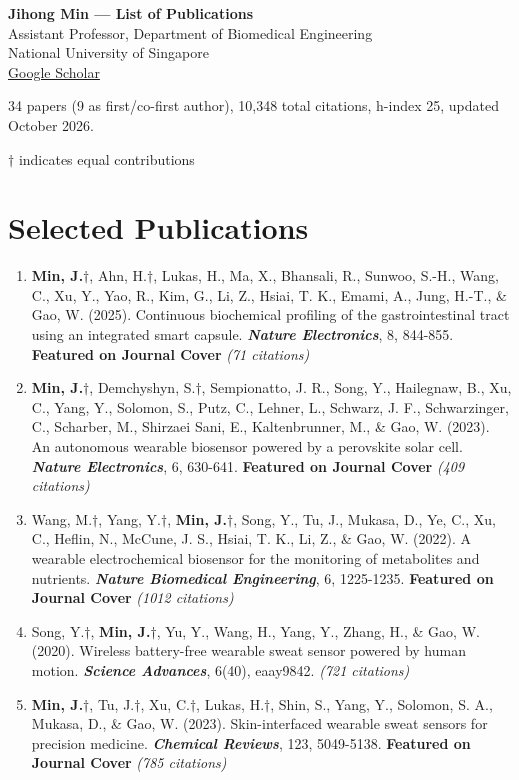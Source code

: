 \documentclass[11pt,a4paper]{article}
\begin{document}
{\LARGE \textbf{Jihong Min --- List of Publications}} \\[4pt]
Assistant Professor, Department of Biomedical Engineering \\
National University of Singapore \\
\href{https://scholar.google.com/citations?user=T4pVa1UAAAAJ}{Google Scholar}

34 papers (9 as first/co-first author), 10,348 total citations, h-index 25, updated October 2026.

$\dagger$ indicates equal contributions

\section{Selected Publications}
\begin{enumerate}[leftmargin=*, itemsep=3pt, parsep=0pt, topsep=2pt]
  \item \textbf{Min, J.}$\dagger$, Ahn, H.$\dagger$, Lukas, H., Ma, X., Bhansali, R., Sunwoo, S.-H., Wang, C., Xu, Y., Yao, R., Kim, G., Li, Z., Hsiai, T. K., Emami, A., Jung, H.-T., \& Gao, W. (2025). Continuous biochemical profiling of the gastrointestinal tract using an integrated smart capsule. \textbf{\textit{Nature Electronics}}, 8, 844-855. \textbf{Featured on Journal Cover} \textit{(71 citations)}
  \item \textbf{Min, J.}$\dagger$, Demchyshyn, S.$\dagger$, Sempionatto, J. R., Song, Y., Hailegnaw, B., Xu, C., Yang, Y., Solomon, S., Putz, C., Lehner, L., Schwarz, J. F., Schwarzinger, C., Scharber, M., Shirzaei Sani, E., Kaltenbrunner, M., \& Gao, W. (2023). An autonomous wearable biosensor powered by a perovskite solar cell. \textbf{\textit{Nature Electronics}}, 6, 630-641. \textbf{Featured on Journal Cover} \textit{(409 citations)}
  \item Wang, M.$\dagger$, Yang, Y.$\dagger$, \textbf{Min, J.}$\dagger$, Song, Y., Tu, J., Mukasa, D., Ye, C., Xu, C., Heflin, N., McCune, J. S., Hsiai, T. K., Li, Z., \& Gao, W. (2022). A wearable electrochemical biosensor for the monitoring of metabolites and nutrients. \textbf{\textit{Nature Biomedical Engineering}}, 6, 1225-1235. \textbf{Featured on Journal Cover} \textit{(1012 citations)}
  \item Song, Y.$\dagger$, \textbf{Min, J.}$\dagger$, Yu, Y., Wang, H., Yang, Y., Zhang, H., \& Gao, W. (2020). Wireless battery-free wearable sweat sensor powered by human motion. \textbf{\textit{Science Advances}}, 6(40), eaay9842. \textit{(721 citations)}
  \item \textbf{Min, J.}$\dagger$, Tu, J.$\dagger$, Xu, C.$\dagger$, Lukas, H.$\dagger$, Shin, S., Yang, Y., Solomon, S. A., Mukasa, D., \& Gao, W. (2023). Skin-interfaced wearable sweat sensors for precision medicine. \textbf{\textit{Chemical Reviews}}, 123, 5049-5138. \textbf{Featured on Journal Cover} \textit{(785 citations)}

\end{enumerate}
\end{document}
